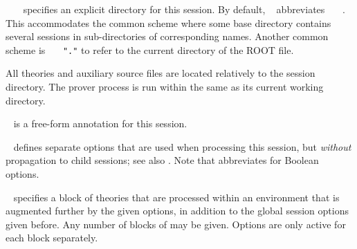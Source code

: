\begin{isabellebody}
\begin{isamarkuptext}
\begin{description}
  \item {}~~~
  specifies an explicit directory for this session.  By default,
  ~ abbreviates
  ~~~.  This
  accommodates the common scheme where some base directory contains
  several sessions in sub-directories of corresponding names.  Another
  common scheme is ~~~\verb|"."| to refer to the current
  directory of the ROOT file.

  All theories and auxiliary source files are located relatively to
  the session directory.  The prover process is run within the same as
  its current working directory.

  \item {}~ is a free-form
  annotation for this session.

  \item {}~ defines
  separate options that are used when processing this session, but
  \emph{without} propagation to child sessions; see also
  .  Note that  abbreviates
   for Boolean options.

  \item {}~ specifies a
  block of theories that are processed within an environment that is
  augmented further by the given options, in addition to the global
  session options given before.  Any number of blocks of
   may be given.  Options are only active for
  each  block separately.


\end{description}
\end{isamarkuptext}
\end{isabellebody}
